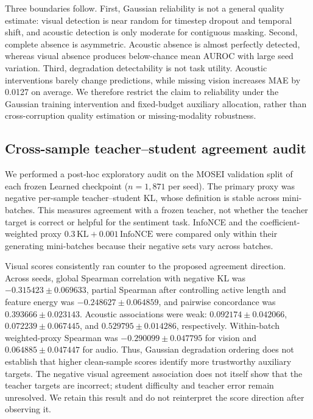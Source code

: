 Three boundaries follow. First, Gaussian reliability is not a general quality
estimate: visual detection is near random for timestep dropout and temporal
shift, and acoustic detection is only moderate for contiguous masking.
Second, complete absence is asymmetric. Acoustic absence is almost perfectly
detected, whereas visual absence produces below-chance mean AUROC with large
seed variation. Third, degradation detectability is not task utility.
Acoustic interventions barely change predictions, while missing vision
increases MAE by 0.0127 on average. We therefore restrict the claim to
reliability under the Gaussian training intervention and fixed-budget
auxiliary allocation, rather than cross-corruption quality estimation or
missing-modality robustness.

\subsection{Cross-sample teacher--student agreement
audit}\label{cross-sample-agreement-audit}

We performed a post-hoc exploratory audit on the MOSEI validation split of
each frozen Learned checkpoint ($n=1{,}871$ per seed). The primary proxy was
negative per-sample teacher--student KL, whose definition is stable across
mini-batches. This measures agreement with a frozen teacher, not whether the
teacher target is correct or helpful for the sentiment task.
InfoNCE and the coefficient-weighted proxy
$0.3\,\mathrm{KL}+0.001\,\mathrm{InfoNCE}$ were compared only within their
generating mini-batches because their negative sets vary across batches.

Visual scores consistently ran counter to the proposed agreement direction.
Across seeds, global Spearman correlation with negative KL was
$-0.315423\pm0.069633$, partial Spearman after controlling active length and
feature energy was $-0.248627\pm0.064859$, and pairwise concordance was
$0.393666\pm0.023143$. Acoustic associations were weak:
$0.092174\pm0.042066$, $0.072239\pm0.067445$, and
$0.529795\pm0.014286$, respectively. Within-batch weighted-proxy Spearman was
$-0.290099\pm0.047795$ for vision and $0.064885\pm0.047447$ for audio. Thus,
Gaussian degradation ordering does not establish that higher clean-sample
scores identify more trustworthy auxiliary targets. The negative visual
agreement association does not itself show that the teacher targets are
incorrect; student difficulty and teacher error remain unresolved. We retain
this result and do not reinterpret the score direction after observing it.

